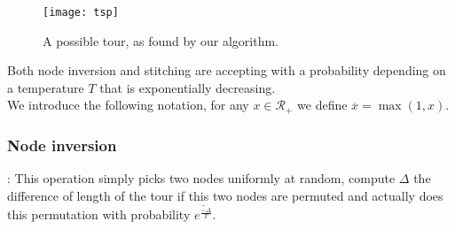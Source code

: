 \documentclass[fontsize=9pt,twocolumns,enabledeprecatedfontcommands]{scrartcl}
\begin{document}
\begin{figure}[hp]
	\centering
	\texttt{[image: tsp]}
	\label{tsp_sol}
	\caption{A possible tour, as found by our algorithm.}
\end{figure}


Both node inversion and stitching are accepting with a probability depending on a temperature $T$ that is exponentially decreasing.\\

We introduce the following notation, for any $x \in \mathcal{R}_+$ we define $\overline{x} = \max(1,x)$.

\subsubsection{Node inversion}:
This operation simply picks two nodes uniformly at random, compute $\Delta$ the difference of length of the tour if this two nodes are permuted and actually does this permutation with probability $\overline{e^{\frac{-\Delta}{T}}}$.
\end{document}
